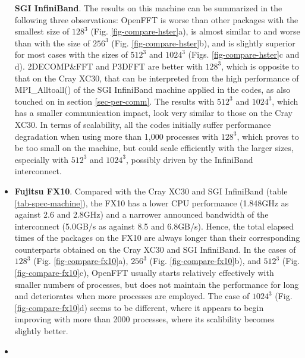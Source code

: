 \begin{itemize}
\textbf{SGI InfiniBand}. The results on this machine can be summarized in the following three observations: OpenFFT is worse than other packages with the smallest size of $128^3$ (Fig. \ref{fig-compare-hster}a), is almost similar to and worse than with the size of $256^3$ (Fig. \ref{fig-compare-hster}b), and is slightly superior for most cases with the sizes of $512^3$ and $1024^3$ (Figs. \ref{fig-compare-hster}c and d). 2DECOMP\&FFT and P3DFFT are better with $128^3$, which is opposite to that on the Cray XC30, that can be interpreted from the high performance of MPI\_Alltoall() of the SGI InfiniBand machine applied in the codes, as also touched on in section \ref{sec-per-comm}. The results with $512^3$ and $1024^3$, which has a smaller communication impact, look very similar to those on the Cray XC30. In terms of scalability, all the codes initially suffer performance degradation when using more than 1,000 processes with $128^3$, which proves to be too small on the machine, but could scale efficiently with the larger sizes, especially with $512^3$ and $1024^3$, possibly driven by the InfiniBand interconnect.   
\item
\textbf{Fujitsu FX10}. Compared with the Cray XC30 and SGI InfiniBand (table \ref{tab-spec-machine}), the FX10 has a lower CPU performance (1.848GHz as against 2.6 and 2.8GHz) and a narrower announced bandwidth of the interconnect (5.0GB/s as against 8.5 and 6.8GB/s). Hence, the total elapsed times of the packages on the FX10 are always longer than their corresponding counterparts obtained on the Cray XC30 and SGI InfiniBand. In the cases of $128^3$ (Fig. \ref{fig-compare-fx10}a), $256^3$ (Fig. \ref{fig-compare-fx10}b), and $512^3$ (Fig. \ref{fig-compare-fx10}c), OpenFFT usually starts relatively effectively with smaller numbers of processes, but does not maintain the performance for long and deteriorates when more processes are employed. The case of $1024^3$ (Fig. \ref{fig-compare-fx10}d) seems to be different, where it appears to begin improving with more than 2000 processes, where its scalibility becomes slightly better.   
\item

\end{itemize}
